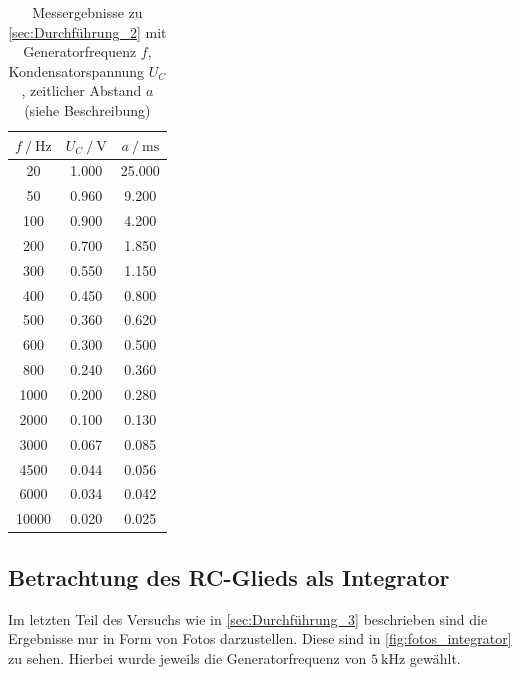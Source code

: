 \begin{table}
    \centering
    \caption{Messergebnisse zu \autoref{sec:Durchführung_2} mit Generatorfrequenz $f$, Kondensatorspannung $U_C$, zeitlicher Abstand $a$ (siehe Beschreibung)}
    \label{tab:gemessen}
    \begin{tabular}{c c c}
        \toprule
        $f \:/\: \si{\hertz}$ & $U_C \:/\: \si{\volt}$ & $a \:/\: \si{\milli\second}$ \\
        \midrule
        20 & 1.000 & 25.000 \\
        50 & 0.960 & 9.200 \\
        100 & 0.900 & 4.200 \\
        200 & 0.700 & 1.850 \\
        300 & 0.550 & 1.150 \\
        400 & 0.450 & 0.800 \\
        500 & 0.360 & 0.620 \\
        600 & 0.300 & 0.500 \\
        800 & 0.240 & 0.360 \\
        1000 & 0.200 & 0.280 \\
        2000 & 0.100 & 0.130 \\
        3000 & 0.067 & 0.085 \\
        4500 & 0.044 & 0.056 \\
        6000 & 0.034 & 0.042 \\
        10000 & 0.020 & 0.025 \\
        \bottomrule
    \end{tabular}
\end{table}

\subsection{Betrachtung des RC-Glieds als Integrator}
\label{sec:Auswertung_Integrator}

Im letzten Teil des Versuchs wie in \autoref{sec:Durchführung_3} beschrieben sind die Ergebnisse nur in Form von Fotos darzustellen. Diese sind in \autoref{fig:fotos_integrator} zu sehen. Hierbei wurde jeweils die Generatorfrequenz von $\SI{5}{\kilo\hertz}$ gewählt.

